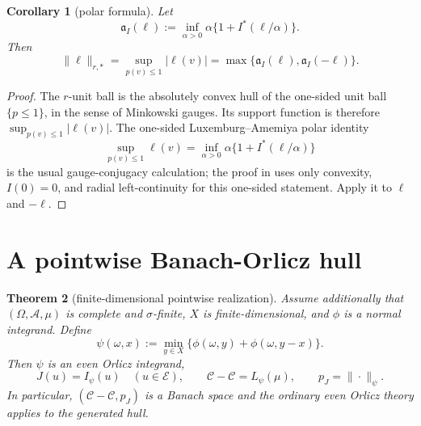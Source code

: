 \documentclass[11pt]{article}
\newtheorem{theorem}{Theorem}
\newtheorem{corollary}[theorem]{Corollary}
\theoremstyle{definition}
\newcommand{\cC}{\mathcal C}
\newcommand{\cE}{\mathcal E}
\newcommand{\pJ}{p_J}
\begin{document}
\begin{corollary}[polar formula]\label{cor:polar}
Let
\[
 \mathfrak a_I(\ell):=
 \inf_{\alpha>0}\alpha\{1+I^*(\ell/\alpha)\}.
\]
Then
\[
 \|\ell\|_{r,*}
 =\sup_{p(v)\le1}|\ell(v)|
 =\max\{\mathfrak a_I(\ell),\mathfrak a_I(-\ell)\}.
\tag{6.4}\label{eq:polar}
\]
\end{corollary}

\begin{proof}
The $r$-unit ball is the absolutely convex hull of the one-sided unit ball
$\{p\le1\}$, in the sense of Minkowski gauges.  Its support function is
therefore $\sup_{p(v)\le1}|\ell(v)|$.  The one-sided
Luxemburg--Amemiya polar identity
\[
 \sup_{p(v)\le1}\ell(v)
 =\inf_{\alpha>0}\alpha\{1+I^*(\ell/\alpha)\}
\]
is the usual gauge-conjugacy calculation; the proof in
\cite[\S3.1]{Ruf2023} uses only convexity, $I(0)=0$, and radial
left-continuity for this one-sided statement.  Apply it to $\ell$ and
$-\ell$.
\end{proof}

\section{A pointwise Banach-Orlicz hull}

\begin{theorem}[finite-dimensional pointwise realization]
\label{thm:pointwise}
Assume additionally that $(\Omega,\mathcal A,\mu)$ is complete and
$\sigma$-finite, $X$ is finite-dimensional, and $\phi$ is a normal integrand.
Define
\[
 \psi(\omega,x):=
 \min_{y\in X}\{\phi(\omega,y)+\phi(\omega,y-x)\}.
\tag{7.1}\label{eq:psi}
\]
Then $\psi$ is an even Orlicz integrand,
\[
 J(u)=I_\psi(u)\quad(u\in\cE),\qquad
 \cC-\cC=L_\psi(\mu),\qquad
 \pJ=\|\cdot\|_\psi.
\tag{7.2}\label{eq:pointwise}
\]
In particular, $(\cC-\cC,\pJ)$ is a Banach space and the ordinary even
Orlicz theory applies to the generated hull.
\end{theorem}
\end{document}

